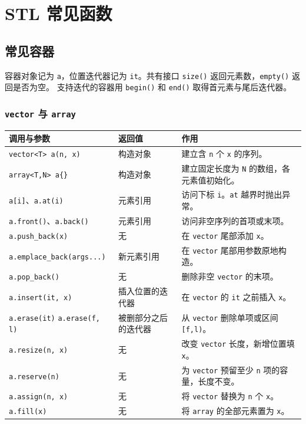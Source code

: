 \chapter{STL 常见函数}

\newenvironment{stlapi}{%
    \small
    \begin{longtable}{@{}%
        >{\raggedright\arraybackslash}p{0.35\textwidth}%
        >{\raggedright\arraybackslash}p{0.20\textwidth}%
        >{\raggedright\arraybackslash}p{0.38\textwidth}@{}}
    \toprule
    调用与参数 & 返回值 & 作用 \\
    \midrule
    \endhead
    \bottomrule
    \endlastfoot
}{\end{longtable}}

\section{常见容器}

容器对象记为 \texttt{a}，位置迭代器记为 \texttt{it}。共有接口 \texttt{size()} 返回元素数，\texttt{empty()} 返回是否为空。
支持迭代的容器用 \texttt{begin()} 和 \texttt{end()} 取得首元素与尾后迭代器。

\subsection{\texttt{vector} 与 \texttt{array}}

\begin{stlapi}
    \texttt{vector<T> a(n, x)} & 构造对象 & 建立含 \texttt{n} 个 \texttt{x} 的序列。 \\
    \texttt{array<T,N> a\{\}} & 构造对象 & 建立固定长度为 \texttt{N} 的数组，各元素值初始化。 \\
    \texttt{a[i]}、\texttt{a.at(i)} & 元素引用 & 访问下标 \texttt{i}。\texttt{at} 越界时抛出异常。 \\
    \texttt{a.front()}、\texttt{a.back()} & 元素引用 & 访问非空序列的首项或末项。 \\
    \texttt{a.push\_back(x)} & 无 & 在 \texttt{vector} 尾部添加 \texttt{x}。 \\
    \texttt{a.emplace\_back(args...)} & 新元素引用 & 在 \texttt{vector} 尾部用参数原地构造。 \\
    \texttt{a.pop\_back()} & 无 & 删除非空 \texttt{vector} 的末项。 \\
    \texttt{a.insert(it, x)} & 插入位置的迭代器 & 在 \texttt{vector} 的 \texttt{it} 之前插入 \texttt{x}。 \\
    \texttt{a.erase(it)} \newline
    \texttt{a.erase(f, l)} & 被删部分之后的迭代器 & 从 \texttt{vector} 删除单项或区间 \texttt{[f,l)}。 \\
    \texttt{a.resize(n, x)} & 无 & 改变 \texttt{vector} 长度，新增位置填 \texttt{x}。 \\
    \texttt{a.reserve(n)} & 无 & 为 \texttt{vector} 预留至少 \texttt{n} 项的容量，长度不变。 \\
    \texttt{a.assign(n, x)} & 无 & 将 \texttt{vector} 替换为 \texttt{n} 个 \texttt{x}。 \\
    \texttt{a.fill(x)} & 无 & 将 \texttt{array} 的全部元素置为 \texttt{x}。 \\
\end{stlapi}

